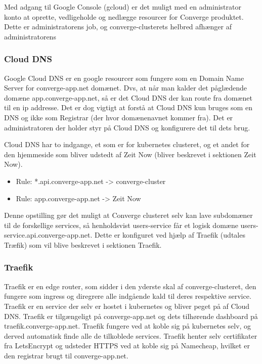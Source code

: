 Med adgang til Google Console (gcloud) er det muligt med en administrator konto at oprette, vedligeholde og nedlægge resourcer for Converge produktet. Dette er administratorens job, og converge-clusterets helbred afhænger af administratorens

\subsubsection{Cloud DNS}

Google Cloud DNS er en google resourcer som fungere som en Domain Name Server for converge-app.net domænet. Dvs, at når man kalder det påglædende domæne app.converge-app.net, så er det Cloud DNS der kan route fra domænet til en ip addresse. Det er dog vigtigt at forstå at Cloud DNS kun bruges som en DNS og ikke som Registrar (der hvor domænenavnet kommer fra). Det er administratoren der holder styr på Cloud DNS og konfigurere det til dets brug.

Cloud DNS har to indgange, et som er for kubernetes clusteret, og et andet for den hjemmeside som bliver udstedt af Zeit Now (bliver beskrevet i sektionen Zeit Now).

\begin{itemize}
    \item Rule: *.api.converge-app.net -> converge-cluster
    \item Rule: app.converge-app.net -> Zeit Now
\end{itemize}

Denne opstilling gør det muligt at Converge clusteret selv kan lave subdomæner til de forskellige services, så henholdsvist users-service får et logisk domæne users-service.api.converge-app.net. Dette er konfiguret ved hjælp af Traefik (udtales Træfik) som vil blive beskrevet i sektionen Traefik.

\subsubsection{Traefik}

Traefik er en edge router, som sidder i den yderste skal af converge-clusteret, den fungere som ingress og diregrere alle indgående kald til deres respektive service. Traefik er en service der selv er hostet i kubernetes og bliver peget på af Cloud DNS. Traefik er tilgængeligt på converge-app.net og dets tilhørende dashboard på traefik.converge-app.net. Traefik fungere ved at koble sig på kubernetes selv, og derved automatisk finde alle de tilkoblede services. Traefik henter selv certifikater fra LetsEncrypt og udsteder HTTPS ved at koble sig på Namecheap, hvilket er den registrar brugt til converge-app.net.

